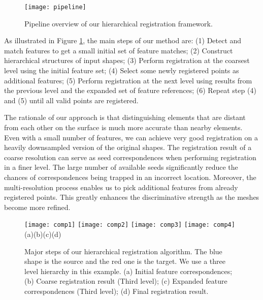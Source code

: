 \begin{figure}
\centering
  \texttt{[image: pipeline]}
  \caption{Pipeline overview of our hierarchical registration framework.}
\label{fig:pipe}
\end{figure}

As illustrated in Figure \ref{fig:pipe}, the main steps of our method are: (1) Detect and match features to get a small initial set of feature matches; (2) Construct hierarchical structures of input shapes; (3) Perform registration at the coarsest level using the initial feature set; (4) Select some newly registered points as additional features; (5) Perform registration at the next level using results from the previous level and the expanded set of feature references; (6) Repeat step (4) and (5) until all valid points are registered.

The rationale of our approach is that distinguishing elements that are distant from each other on the surface is much more accurate than nearby elements. Even with a small number of features, we can achieve very good registration on a heavily downsampled version of the original shapes. The registration result of a coarse resolution can serve as seed correspondences when performing registration in a finer level. The large number of available seeds significantly reduce the chances of correspondences being trapped in an incorrect location. Moreover, the multi-resolution process enables us to pick additional features from already registered points. This greatly enhances the discriminative strength as the meshes become more refined.

\begin{figure}
\centering
  \texttt{[image: comp1]}
\hspace{10pt}
  \texttt{[image: comp2]}
\hspace{10pt}
  \texttt{[image: comp3]}
\hspace{10pt}
  \texttt{[image: comp4]}\\
(a)\hspace{0.21\linewidth}(b)\hspace{0.21\linewidth}(c)\hspace{0.21\linewidth}(d)
  \caption{Major steps of our hierarchical registration algorithm. The blue shape is the source and the red one is the target. We use a three level hierarchy in this example. (a) Initial feature correspondences; (b) Coarse registration result (Third level); (c) Expanded feature correspondences (Third level); (d) Final registration result.}
\label{fig:components}
\end{figure}

